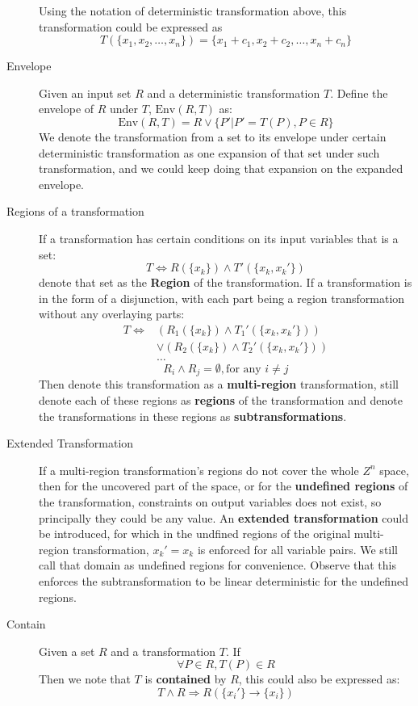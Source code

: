 \documentclass[letterpaper,]{article}
\begin{document}
\begin{description}
Using the notation of deterministic transformation above, this
transformation could be expressed as
\[T(\{x_1, x_2, \dots, x_n\}) = \{x_1 + c_1, x_2 + c_2, \dots, x_n + c_n\} \]
\item[Envelope]
Given an input set \(R\) and a deterministic transformation \(T\).
Define the envelope of \(R\) under \(T\), \(\mathrm{Env}(R, T)\) as:
\[\mathrm{Env}(R,T) = R \lor \{P'| P' = T(P), P \in R\} \] We denote the
transformation from a set to its envelope under certain deterministic
transformation as one expansion of that set under such transformation,
and we could keep doing that expansion on the expanded envelope.
\item[Regions of a transformation]
If a transformation has certain conditions on its input variables that
is a set: \[ T \Leftrightarrow  R(\{x_k\})\land T'(\{x_k, x_k'\})\]
denote that set as the \textbf{Region} of the transformation. If a
transformation is in the form of a disjunction, with each part being a
region transformation without any overlaying parts:
\[\begin{split} T  \Leftrightarrow  &(R_1(\{x_k\})\land T_1'(\{x_k, x_k'\}))\\
&\lor(R_2(\{x_k\})\land T_2'(\{x_k, x_k'\}))\\
&\dots
\end{split} \] \[R_i \land R_j = \emptyset, \text{for any } i \neq j\]
Then denote this transformation as a \textbf{multi-region}
transformation, still denote each of these regions as \textbf{regions}
of the transformation and denote the transformations in these regions as
\textbf{subtransformations}.
\item[Extended Transformation]
If a multi-region transformation's regions do not cover the whole
\(Z^n\) space, then for the uncovered part of the space, or for the
\textbf{undefined regions} of the transformation, constraints on output
variables does not exist, so principally they could be any value. An
\textbf{extended transformation} could be introduced, for which in the
undfined regions of the original multi-region transformation,
\(x_k' = x_k\) is enforced for all variable pairs. We still call that
domain as undefined regions for convenience. Observe that this enforces
the subtransformation to be linear deterministic for the undefined
regions.
\item[Contain]
Given a set \(R\) and a transformation \(T\). If
\[\forall P \in R, T(P) \in R \] Then we note that \(T\) is
\textbf{contained} by \(R\), this could also be expressed as:
\[T \land R \Rightarrow R(\{x_i'\} \to \{x_i\}) \]
\end{description}
\end{document}
